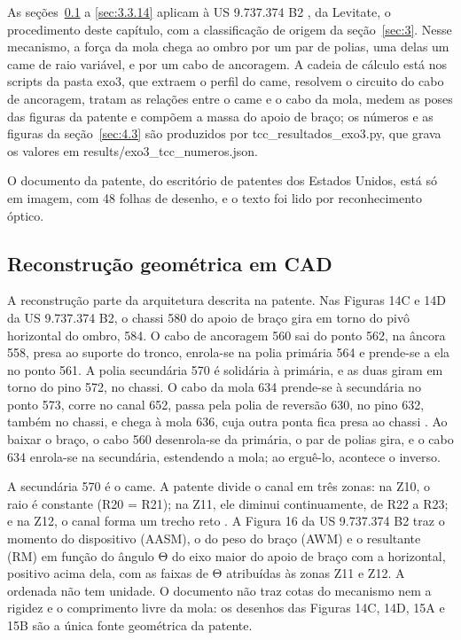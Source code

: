 As seções~\ref{sec:3.3.1} a \ref{sec:3.3.14} aplicam à US 9.737.374 B2 \cite{doyle2017}, da Levitate, o procedimento deste capítulo, com a classificação de origem da seção~\ref{sec:3}. Nesse mecanismo, a força da mola chega ao ombro por um par de polias, uma delas um came de raio variável, e por um cabo de ancoragem. A cadeia de cálculo está nos scripts da pasta exo3, que extraem o perfil do came, resolvem o circuito do cabo de ancoragem, tratam as relações entre o came e o cabo da mola, medem as poses das figuras da patente e compõem a massa do apoio de braço; os números e as figuras da seção~\ref{sec:4.3} são produzidos por tcc\_resultados\_exo3.py, que grava os valores em results/exo3\_tcc\_numeros.json.

O documento da patente, do escritório de patentes dos Estados Unidos, está só em imagem, com 48 folhas de desenho, e o texto foi lido por reconhecimento óptico.

\subsection{Reconstrução geométrica em CAD}\label{sec:3.3.1}

A reconstrução parte da arquitetura descrita na patente. Nas Figuras 14C e 14D da US 9.737.374 B2, o chassi 580 do apoio de braço gira em torno do pivô horizontal do ombro, 584. O cabo de ancoragem 560 sai do ponto 562, na âncora 558, presa ao suporte do tronco, enrola-se na polia primária 564 e prende-se a ela no ponto 561. A polia secundária 570 é solidária à primária, e as duas giram em torno do pino 572, no chassi. O cabo da mola 634 prende-se à secundária no ponto 573, corre no canal 652, passa pela polia de reversão 630, no pino 632, também no chassi, e chega à mola 636, cuja outra ponta fica presa ao chassi \cite{doyle2017}. Ao baixar o braço, o cabo 560 desenrola-se da primária, o par de polias gira, e o cabo 634 enrola-se na secundária, estendendo a mola; ao erguê-lo, acontece o inverso.

A secundária 570 é o came. A patente divide o canal em três zonas: na Z10, o raio é constante (R20 = R21); na Z11, ele diminui continuamente, de R22 a R23; e na Z12, o canal forma um trecho reto \cite{doyle2017}. A Figura 16 da US 9.737.374 B2 traz o momento do dispositivo (AASM), o do peso do braço (AWM) e o resultante (RM) em função do ângulo Θ do eixo maior do apoio de braço com a horizontal, positivo acima dela, com as faixas de Θ atribuídas às zonas Z11 e Z12. A ordenada não tem unidade. O documento não traz cotas do mecanismo nem a rigidez e o comprimento livre da mola: os desenhos das Figuras 14C, 14D, 15A e 15B são a única fonte geométrica da patente.

